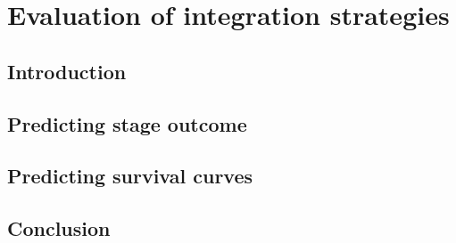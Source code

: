 \chapter{Evaluation of integration strategies}
\label{cha:evaluation}

\section{Introduction}
\label{sec:evaluation-introduction}
\section{Predicting stage outcome}
\label{sec:evaluation-predictingstage}
\section{Predicting survival curves}
\label{sec:evaluation-predictingsurvival}
\section{Conclusion}
\label{sec:evaluation-conclusion}
